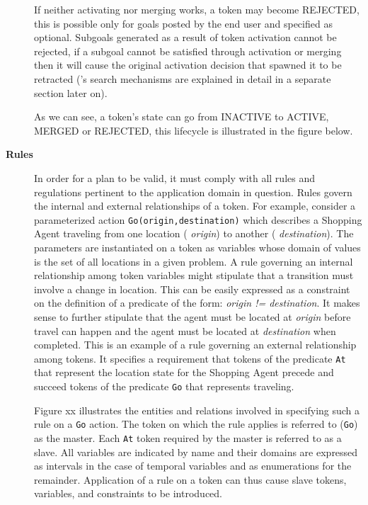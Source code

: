\begin{description}

If neither activating nor merging works, a token may become REJECTED,
this is possible only for goals posted by the end user and specified
as optional. Subgoals generated as a result of token activation cannot
be rejected, if a subgoal cannot be satisfied through activation or
merging then it will cause the original activation decision that
spawned it to be retracted (\eu's search mechanisms are explained in
detail in a separate section later on).

As we can see, a token's state can go from INACTIVE to ACTIVE, MERGED
or REJECTED, this lifecycle is illustrated in the figure below.


\item[\textbf{Rules}] In order for a plan to be valid, it must comply
  with all rules and regulations pertinent to the application domain
  in question. Rules govern the internal and external relationships of
  a token. For example, consider a parameterized action
  \texttt{Go(origin,destination)} which describes a Shopping Agent
  traveling from one location ( \textit{origin}) to another (
  \textit{destination}). The parameters are instantiated on a token as
  variables whose domain of values is the set of all locations in a
  given problem. A rule governing an internal relationship among token
  variables might stipulate that a transition must involve a change in
  location. This can be easily expressed as a constraint on the
  definition of a predicate of the form: \textit{origin !=
    destination}. It makes sense to further stipulate that the agent
  must be located at \textit{origin} before travel can happen and the
  agent must be located at \textit{destination} when completed. This
  is an example of a rule governing an external relationship among
  tokens. It specifies a requirement that tokens of the predicate
  \texttt{At} that represent the location state for the Shopping Agent
  precede and succeed tokens of the predicate \texttt{Go} that
  represents traveling.


Figure xx illustrates the entities and relations involved in
specifying such a rule on a \texttt{Go} action. The token on which the
rule applies is referred to (\texttt{Go}) as the master. Each
\texttt{At} token required by the master is referred to as a
slave. All variables are indicated by name and their domains are
expressed as intervals in the case of temporal variables and as
enumerations for the remainder. Application of a rule on a token can
thus cause slave tokens, variables, and constraints to be introduced.


\end{description}
